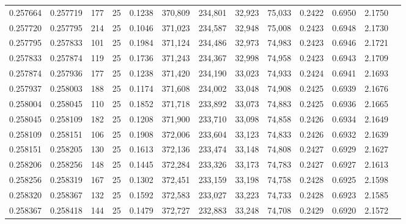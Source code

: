 \begin{tabular}{rrrrrrrrrrrrr}
0.257664 & 0.257719 &   177 &  25 &                                     0.1238 & 370,809 & 234,801 &  32,923 &  75,033 & 0.2422 & 0.6950 & 2.1750 \\
0.257720 & 0.257795 &   214 &  25 &                                     0.1046 & 371,023 & 234,587 &  32,948 &  75,008 & 0.2423 & 0.6948 & 2.1730 \\
0.257795 & 0.257833 &   101 &  25 &                                     0.1984 & 371,124 & 234,486 &  32,973 &  74,983 & 0.2423 & 0.6946 & 2.1721 \\
0.257833 & 0.257874 &   119 &  25 &                                     0.1736 & 371,243 & 234,367 &  32,998 &  74,958 & 0.2423 & 0.6943 & 2.1709 \\
0.257874 & 0.257936 &   177 &  25 &                                     0.1238 & 371,420 & 234,190 &  33,023 &  74,933 & 0.2424 & 0.6941 & 2.1693 \\
0.257937 & 0.258003 &   188 &  25 &                                     0.1174 & 371,608 & 234,002 &  33,048 &  74,908 & 0.2425 & 0.6939 & 2.1676 \\
0.258004 & 0.258045 &   110 &  25 &                                     0.1852 & 371,718 & 233,892 &  33,073 &  74,883 & 0.2425 & 0.6936 & 2.1665 \\
0.258045 & 0.258109 &   182 &  25 &                                     0.1208 & 371,900 & 233,710 &  33,098 &  74,858 & 0.2426 & 0.6934 & 2.1649 \\
0.258109 & 0.258151 &   106 &  25 &                                     0.1908 & 372,006 & 233,604 &  33,123 &  74,833 & 0.2426 & 0.6932 & 2.1639 \\
0.258151 & 0.258205 &   130 &  25 &                                     0.1613 & 372,136 & 233,474 &  33,148 &  74,808 & 0.2427 & 0.6929 & 2.1627 \\
0.258206 & 0.258256 &   148 &  25 &                                     0.1445 & 372,284 & 233,326 &  33,173 &  74,783 & 0.2427 & 0.6927 & 2.1613 \\
0.258256 & 0.258319 &   167 &  25 &                                     0.1302 & 372,451 & 233,159 &  33,198 &  74,758 & 0.2428 & 0.6925 & 2.1598 \\
0.258320 & 0.258367 &   132 &  25 &                                     0.1592 & 372,583 & 233,027 &  33,223 &  74,733 & 0.2428 & 0.6923 & 2.1585 \\
0.258367 & 0.258418 &   144 &  25 &                                     0.1479 & 372,727 & 232,883 &  33,248 &  74,708 & 0.2429 & 0.6920 & 2.1572 \\

\end{tabular}
